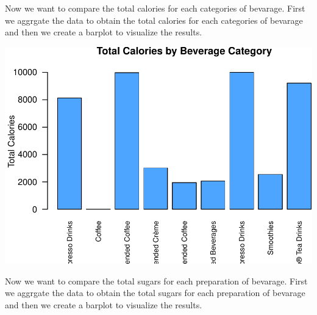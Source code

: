 \documentclass[
]{article}
\newenvironment{Shaded}{\begin{snugshade}}{\end{snugshade}}
\newcommand{\AttributeTok}[1]{\textcolor[rgb]{0.13,0.29,0.53}{#1}}
\newcommand{\DecValTok}[1]{\textcolor[rgb]{0.00,0.00,0.81}{#1}}
\newcommand{\FloatTok}[1]{\textcolor[rgb]{0.00,0.00,0.81}{#1}}
\newcommand{\FunctionTok}[1]{\textcolor[rgb]{0.13,0.29,0.53}{\textbf{#1}}}
\newcommand{\NormalTok}[1]{#1}
\newcommand{\OtherTok}[1]{\textcolor[rgb]{0.56,0.35,0.01}{#1}}
\newcommand{\SpecialCharTok}[1]{\textcolor[rgb]{0.81,0.36,0.00}{\textbf{#1}}}
\newcommand{\StringTok}[1]{\textcolor[rgb]{0.31,0.60,0.02}{#1}}
\begin{document}
Now we want to compare the total calories for each categories of
bevarage. First we aggrgate the data to obtain the total calories for
each categories of bevarage and then we create a barplot to visualize
the results.

\begin{Shaded}
\end{Shaded}

\begin{center}\includegraphics{Statistical_Learning_Final_Report_files/figure-latex/total_calories-1} \end{center}

Now we want to compare the total sugars for each preparation of
bevarage. First we aggrgate the data to obtain the total sugars for each
preparation of bevarage and then we create a barplot to visualize the
results.
\end{document}
